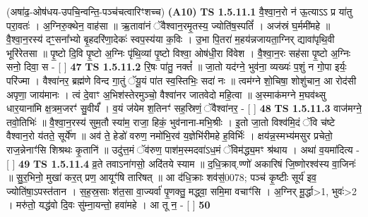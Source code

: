 \documentclass[17pt]{extarticle}
\begin{document}
                  \newline
                      (अषा॑ढ॒-ओष॑धय-उपचि॒न्वन्ति॒-पञ्च॑चत्वारिꣳशच्च)  \textbf{(A10)} \newline \newline
                                        \textbf{ TS 1.5.11.1} \newline
                  वै॒श्वा॒न॒रो न॑ ऊ॒त्याऽऽ प्र या॑तु परा॒वतः॑ । अ॒ग्निरु॒क्थेन॒ वाह॑सा ॥ ऋ॒तावा॑नं ॅवैश्वान॒रमृ॒तस्य॒ ज्योति॑ष॒स्पतिं᳚ । अज॑स्रं घ॒र्ममी॑महे ॥ वै॒श्वा॒न॒रस्य॑ दꣳ॒॒सना᳚भ्यो बृ॒हदरि॑णा॒देकः॑ स्वप॒स्य॑या क॒विः । उ॒भा पि॒तरा॑ म॒हय॑न्नजायता॒ग्निर् द्यावा॑पृथि॒वी भूरि॑रेतसा ॥ पृ॒ष्टो दि॒वि पृ॒ष्टो अ॒ग्निः पृ॑थि॒व्यां पृ॒ष्टो विश्वा॒ ओष॑धी॒रा वि॑वेश । वै॒श्वा॒न॒रः सह॑सा पृ॒ष्टो अ॒ग्निः सनो॒ दिवा॒ स - [ ] \textbf{  47} \newline
                  \newline
                                \textbf{ TS 1.5.11.2} \newline
                  रि॒षः पा॑तु॒ नक्तं᳚ ॥ जा॒तो यद॑ग्ने॒ भुव॑ना॒ व्यख्यः॑ प॒शुं न गो॒पा इर्यः॒ परि॑ज्मा । वैश्वा॑नर॒ ब्रह्म॑णे विन्द गा॒तुं ॅयू॒यं पा॑त स्व॒स्तिभिः॒ सदा॑ नः ॥ त्वम॑ग्ने शो॒चिषा॒ शोशु॑चान॒ आ रोद॑सी अपृणा॒ जाय॑मानः । त्वं दे॒वाꣳ अ॒भिश॑स्तेरमुञ्चो॒ वैश्वा॑नर जातवेदो महि॒त्वा ॥ अ॒स्माक॑मग्ने म॒घव॑थ्सु धार॒याना॑मि क्ष॒त्रम॒जरꣳ॑ सु॒वीर्यं᳚ । व॒यं ज॑येम श॒तिनꣳ॑ सह॒स्रिणं॒ ॅवैश्वा॑नर॒ - [ ] \textbf{  48} \newline
                  \newline
                                \textbf{ TS 1.5.11.3} \newline
                  वाज॑मग्ने॒ तवो॒तिभिः॑ ॥ वै॒श्वा॒न॒रस्य॑ सुम॒तौ स्या॑म॒ राजा॒ हिकं॒ भुव॑नाना-मभि॒श्रीः । इ॒तो जा॒तो विश्व॑मि॒दं ॅवि च॑ष्टे वैश्वान॒रो य॑तते॒ सूर्ये॑ण ॥ अव॑ ते॒ हेडो॑ वरुण॒ नमो॑भि॒रव॑ य॒ज्ञेभि॑रीमहे ह॒विर्भिः॑ । क्षय॑न्न॒स्मभ्य॑मसुर प्रचेतो॒ राज॒न्नेनाꣳ॑सि शिश्रथः कृ॒तानि॑ ॥ उदु॑त्त॒मं ॅव॑रुण॒ पाश॑म॒स्मदवा॑ऽध॒मं ॅविम॑द्ध्य॒मꣳ श्र॑थाय । अथा॑ व॒यमा॑दित्य - [ ] \textbf{  49} \newline
                  \newline
                                \textbf{ TS 1.5.11.4} \newline
                  व्र॒ते तवाऽना॑गसो॒ अदि॑तये स्याम ॥ द॒धि॒क्राव्.ण्णो॑ अकारिषं जि॒ष्णोरश्व॑स्य वा॒जिनः॑ ॥ सु॒र॒भिनो॒ मुखा॑ कर॒त् प्रण॒ आयूꣳ॑षि तारिषत् ॥ आ द॑धि॒क्राः शव॑स॒॑0078; पञ्च॑ कृ॒ष्टीः सूर्य॑ इव॒ ज्योति॑षा॒ऽपस्त॑तान । स॒ह॒स्र॒साः श॑त॒सा वा॒ज्यर्वा॑ पृ॒णक्तु॒ मद्ध्वा॒ समि॒मा वचाꣳ॑सि । अ॒ग्निर् मू॒र्द्धा>1, भुवः॑>2 । मरु॑तो॒ यद्ध॑वो दि॒वः सु॑म्ना॒यन्तो॒ हवा॑महे । आ तू न॒ - [ ] \textbf{  50} \newline
\end{document}
